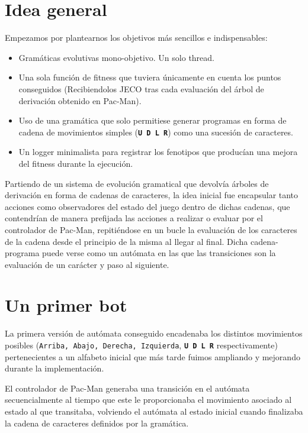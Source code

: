 \section{Idea general}
Empezamos por plantearnos los objetivos más sencillos e indispensables:
\begin{itemize}
\item Gramáticas evolutivas mono-objetivo.
Un solo thread.

\item Una sola función de fitness que tuviera únicamente en cuenta los puntos conseguidos (Recibiendolos JECO tras cada evaluación del árbol de derivación obtenido en Pac-Man).

\item Uso de una gramática que solo permitiese generar programas en forma de cadena de movimientos simples (\textbf{\texttt{U D L R}}) como una sucesión de caracteres.

\item Un logger minimalista para registrar los fenotipos que producían una mejora del fitness durante la ejecución.
\end{itemize}

Partiendo de un sistema de evolución gramatical que devolvía árboles de derivación en forma de cadenas de caracteres, la idea inicial fue encapsular tanto acciones como observadores del estado del juego dentro de dichas cadenas, que contendrían de manera prefijada las acciones a realizar o evaluar por el controlador de Pac-Man, repitiéndose en un bucle la evaluación de los caracteres de la cadena desde el principio de la misma al llegar al final. Dicha cadena-programa puede verse como un autómata en las que las transiciones son la evaluación de un carácter y paso al siguiente.

\section{Un primer bot}
La primera versión de autómata conseguido encadenaba los distintos movimientos posibles (\texttt{Arriba, Abajo, Derecha, Izquierda}, \textbf{\texttt{U D L R}} respectivamente) pertenecientes a un alfabeto inicial que más tarde fuimos ampliando y mejorando durante la implementación.
 
El controlador de Pac-Man generaba una transición en el autómata secuencialmente al tiempo que este le proporcionaba el movimiento asociado al estado al que transitaba, volviendo el autómata al estado inicial cuando finalizaba la cadena de caracteres definidos por la gramática.
 
